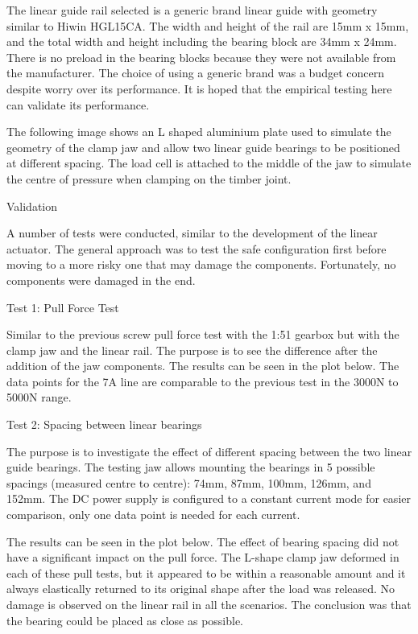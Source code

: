     The linear guide rail selected is a generic brand linear guide with geometry similar to Hiwin HGL15CA. The width and height of the rail are 15mm x 15mm, and the total width and height including the bearing block are 34mm x 24mm. There is no preload in the bearing blocks because they were not available from the manufacturer. The choice of using a generic brand was a budget concern despite worry over its performance. It is hoped that the empirical testing here can validate its performance.

The following image shows an L shaped aluminium plate used to simulate the geometry of the clamp jaw and allow two linear guide bearings to be positioned at different spacing. The load cell is attached to the middle of the jaw to simulate the centre of pressure when clamping on the timber joint.


Validation

A number of tests were conducted, similar to the development of the linear actuator. The general approach was to test the safe configuration first before moving to a more risky one that may damage the components. Fortunately, no components were damaged in the end.

Test 1: Pull Force Test

Similar to the previous screw pull force test with the 1:51 gearbox but with the clamp jaw and the linear rail. The purpose is to see the difference after the addition of the jaw components. The results can be seen in the plot below. The data points for the 7A line are comparable to the previous test in the 3000N to 5000N range. 


Test 2: Spacing between linear bearings

The purpose is to investigate the effect of different spacing between the two linear guide bearings. The testing jaw allows mounting the bearings in 5 possible spacings (measured centre to centre): 74mm, 87mm, 100mm, 126mm, and 152mm. The DC power supply is configured to a constant current mode for easier comparison, only one data point is needed for each current. 

The results can be seen in the plot below. The effect of bearing spacing did not have a significant impact on the pull force. The L-shape clamp jaw deformed in each of these pull tests, but it appeared to be within a reasonable amount and it always elastically returned to its original shape after the load was released. No damage is observed on the linear rail in all the scenarios. The conclusion was that the bearing could be placed as close as possible.

